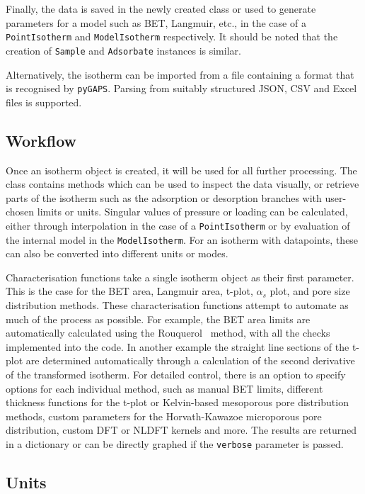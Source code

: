 Finally, the data is saved in the newly created class or used to generate parameters
for a model such as BET, Langmuir, etc., 
in the case of a \texttt{PointIsotherm} and 
\texttt{ModelIsotherm} respectively. It should be noted that the creation of 
\texttt{Sample} and \texttt{Adsorbate} instances is similar.

Alternatively, the isotherm can be imported from a file containing a format that 
is recognised by \texttt{pyGAPS}. Parsing from suitably structured JSON, CSV and Excel
files is supported.

\subsection{Workflow}

Once an isotherm object is created, it will be used for all further processing. 
The class contains methods which can be used to inspect the data visually, or retrieve 
parts of the isotherm such as the adsorption or desorption branches with 
user-chosen limits or units. Singular values of pressure or loading can be calculated,
either through interpolation in the case of a \texttt{PointIsotherm} or by evaluation
of the internal model in the \texttt{ModelIsotherm}. For an isotherm with 
datapoints, these can also be converted into different units or modes.

Characterisation functions take a single isotherm object as their first parameter. This is the 
case for the BET area, Langmuir area, t-plot, \(\alpha_s\) plot, and pore size 
distribution methods. These characterisation functions attempt to automate as much 
of the process as possible. For example, the BET area limits are automatically 
calculated using the Rouquerol~\cite{rouquerolAdsorptionPowdersPorous2013} method, with
all the checks implemented into the code. In another example 
the straight line sections of the t-plot are determined automatically through a calculation of
the second derivative of the transformed isotherm.
For detailed control, there is an option to specify
options for each individual method, such as manual BET limits, different thickness 
functions for the t-plot or Kelvin-based mesoporous pore distribution methods, 
custom parameters for the Horvath-Kawazoe microporous pore distribution, custom 
DFT or NLDFT kernels and more. The results are returned in a dictionary or can be 
directly graphed if the \texttt{verbose} parameter is passed.


\subsection{Units}

